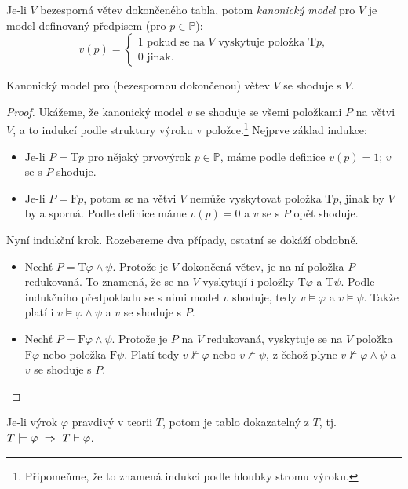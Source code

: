 \begin{definition}\label{definition:canonical-model}
Je-li $V$ bezesporná větev dokončeného tabla, potom \emph{kanonický model} pro $V$ je model definovaný předpisem (pro $p\in\mathbb P$):
$$
v(p)=\begin{cases}
    1 \text{ pokud se na $V$ vyskytuje položka $\mathrm{T}p$,}\\
    0 \text{ jinak.}
\end{cases}
$$  
\end{definition}
\begin{lemma}\label{lemma:canonical-model-agrees}
    Kanonický model pro (bezespornou dokončenou) větev $V$ se shoduje s $V$.
\end{lemma}
\begin{proof}
Ukážeme, že kanonický model $v$ se shoduje se všemi položkami $P$ na větvi $V$, a to indukcí podle struktury výroku v položce.\footnote{Připomeňme, že to znamená indukci podle hloubky stromu výroku.} Nejprve základ indukce:
\begin{itemize}
    \item Je-li $P=\mathrm{T}p$ pro nějaký prvovýrok $p\in\mathbb P$, máme podle definice $v(p)=1$; $v$ se s $P$ shoduje.
    \item Je-li $P=\mathrm{F}p$, potom se na větvi $V$ nemůže vyskytovat položka $\mathrm{T}p$, jinak by $V$ byla sporná. Podle definice máme $v(p)=0$ a $v$ se s $P$ opět shoduje.
\end{itemize}
Nyní indukční krok. Rozebereme dva případy, ostatní se dokáží obdobně.
\begin{itemize}
    \item Nechť $P=\mathrm{T}\varphi\land\psi$. Protože je $V$ dokončená větev, je na ní položka $P$ redukovaná. To znamená, že se na $V$ vyskytují i položky $\mathrm{T}\varphi$ a $\mathrm{T}\psi$. Podle indukčního předpokladu se s nimi model $v$ shoduje, tedy $v\models\varphi$ a $v\models\psi$. Takže platí i $v\models\varphi\land\psi$ a $v$ se shoduje s $P$.
    \item Nechť $P=\mathrm{F}\varphi\land\psi$. Protože je $P$ na $V$ redukovaná, vyskytuje se na $V$ položka $\mathrm{F}\varphi$ nebo položka $\mathrm{F}\psi$. Platí tedy $v\not\models\varphi$ nebo $v\not\models\psi$, z čehož plyne $v\not\models\varphi\land\psi$ a $v$ se shoduje s $P$.
\end{itemize}
\end{proof}

\begin{theorem}[O úplnosti]
    Je-li výrok $\varphi$ pravdivý v teorii $T$, potom je tablo dokazatelný z $T$, tj. $T\models\varphi\ \Rightarrow\ T\proves\varphi$.    
\end{theorem}

